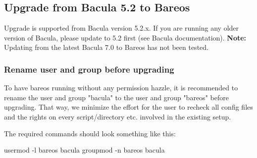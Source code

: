 \subsection{Upgrade from Bacula 5.2 to Bareos}
\label{upgrade-from-bacula-to-bareos}

Upgrade is supported from Bacula version 5.2.x. If you are running any older version of Bacula, please update to 5.2 first (see Bacula documentation). \textbf{Note:} Updating from the latest Bacula 7.0 to Bareos has not been tested.

\subsubsection{Rename user and group before upgrading}

To have bareos running without any permission hazzle, it is recommended to rename the user and group "bacula" to the user and group "bareos" before upgrading. That way, we minimize the effort for the user to recheck all config files and the rights on every script/directory etc. involved in the existing setup.

The required commands should look something like this:

\begin{commands}{}
usermod  -l bareos bacula
groupmod -n bareos bacula
\end{commands}

